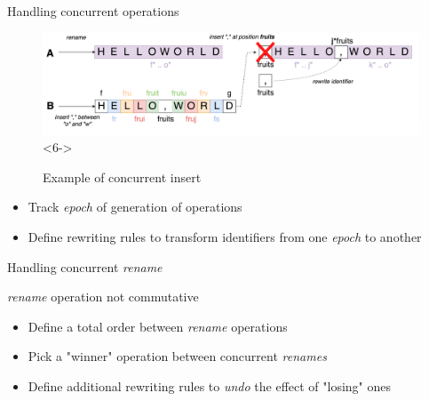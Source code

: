 \documentclass[10pt]{beamer}
\begin{document}
\begin{frame}{Handling concurrent operations}
\begin{figure}
    \includegraphics[scale=0.08]{img/concurrent-insert-rename-6.png}<6->
    \caption{Example of concurrent insert}
  \end{figure}
  \begin{itemize}
    \item<5-> Track \emph{epoch} of generation of operations
    \item<6-> Define rewriting rules to transform identifiers from one \emph{epoch} to another
  \end{itemize}
\end{frame}

\begin{frame}{Handling concurrent \emph{rename}}

  \begin{block}{\alert{\emph{rename} operation not commutative}}
    \begin{itemize}
      \item Define a total order between \emph{rename} operations
      \item Pick a "winner" operation between concurrent \emph{renames}
      \item Define additional rewriting rules to \emph{undo} the effect of "losing" ones
    \end{itemize}
  \end{block}
\end{frame}
\end{document}
